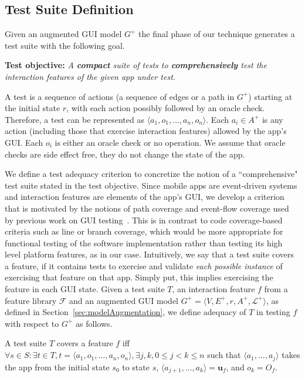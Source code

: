 \subsection{Test Suite Definition}
\label{sec:testSuiteDefinition}

Given an augmented GUI model $G^+$ the final phase of our technique generates a test suite with the following goal.

\noindent\textbf{Test objective:} \textit{A \textbf{compact} suite of tests to \textbf{comprehensively} test the interaction features of the given app under test.}

 A test is a sequence of actions (\ie a sequence of edges or a path in $G^+$) starting at the initial state $r$, with each action possibly followed by an oracle check. Therefore, a test can be represented as $\langle a_1, o_1, \dots, a_n, o_n \rangle$. Each $a_i \in A^+$ is any action (including those that exercise interaction features) allowed by the app's GUI. Each $o_i$ is either an oracle check or no operation. We assume that oracle checks are side effect free, \ie they do not change the state of the app.

We define a test adequacy criterion to concretize the notion of a ``comprehensive" test suite stated in the test objective. Since mobile apps are event-driven systems and interaction features are elements of the app's GUI, we develop a criterion that is motivated by the notions of path coverage and event-flow coverage used by previous work on GUI testing~\cite{memon2001coverage}. This is in contrast to code coverage-based criteria such as line or branch coverage, which would be more appropriate for functional testing of the software implementation rather than testing its high level platform features, as in our case. Intuitively, we say that a test suite covers a feature, if it contains tests to exercise and validate \textit{each possible instance} of exercising that feature on that app. Simply put, this implies exercising the feature in each GUI state. Given a test suite $T$, an interaction feature $f$ from a feature library $\mathcal{F}$ and an augmented GUI model $G^+ = \langle V, E^+, r, A^+, \mathcal{L}^+ \rangle$, as defined in Section~\ref{sec:modelAugmentation}, we define adequacy of $T$ in testing $f$ with respect to $G^+$ as follows.

\begin{mydef}
\label{def:coverage}
A test suite $T$ covers a feature $f$ iff $\forall s \in S: \exists t \in T, t = \langle a_1, o_1, \dots, a_n, o_n  \rangle, \exists j, k, 0 \leq j < k \leq n$ such that $\langle a_1, \dots, a_j \rangle$ takes the app from the initial state $s_0$ to state $s$, $\langle a_{j+1}, \dots, a_k \rangle = \mathbf{u}_f$, and $o_k = O_f$.
\end{mydef}
\vspace*{-2ex}

